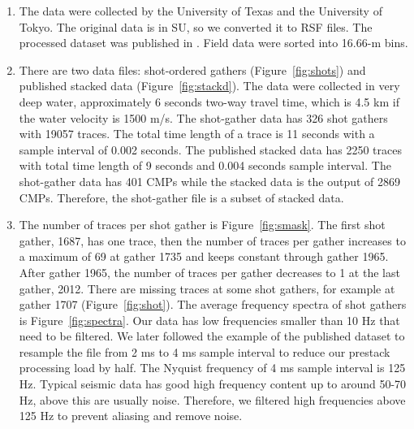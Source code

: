 \begin{enumerate}

\item The data were collected by the University of Texas and the University of Tokyo. The original data is in SU, so we converted it to RSF files. The processed dataset was published in \cite{Moore}. Field data were sorted into 16.66-m bins.   

\item There are two data files: shot-ordered gathers (Figure~\ref{fig:shots}) and published stacked data (Figure~\ref{fig:stackd}). The data were collected in very deep water, approximately 6 seconds two-way travel time, which is 4.5 km if the water velocity is 1500 m/s. The shot-gather data has 326 shot gathers with 19057 traces. The total time length of a trace is 11 seconds with a sample interval of 0.002 seconds. The published stacked data has 2250 traces with total time length of 9 seconds and 0.004 seconds sample interval. The shot-gather data has 401 CMPs while the stacked data is the output of 2869 CMPs. Therefore, the shot-gather file is a subset of stacked data.  

\item The number of traces per shot gather is Figure~\ref{fig:smask}. The first shot gather, 1687, has one trace, then the number of traces per gather increases to a maximum of 69 at gather 1735 and keeps constant through gather 1965. After gather 1965, the number of traces per gather decreases to 1 at the last gather, 2012. There are missing traces at some shot gathers, for example at gather 1707 (Figure~\ref{fig:shot}). The average frequency spectra of shot gathers is Figure~\ref{fig:spectra}. Our data has low frequencies smaller than 10 Hz that need to be filtered. We later followed the example of the published dataset \cite[]{Moore} to resample the file from 2 ms to 4 ms sample interval to reduce our prestack processing load by half. The Nyquist frequency of 4 ms sample interval is 125 Hz. Typical seismic data has good high frequency content up to around 50-70 Hz, above this are usually noise. Therefore, we filtered high frequencies above 125 Hz to prevent aliasing and remove noise.    


\end{enumerate}\clearpage

